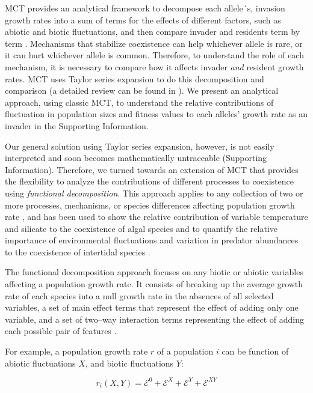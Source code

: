 MCT provides an analytical framework to decompose each allele´s, invasion growth rates into a sum of terms for the effects of different factors, such as abiotic and biotic fluctuations, and then compare invader and residents term by term \citep{ellner_expanded_2019}. Mechanisms that stabilize coexistence can help whichever allele is rare, or it can hurt whichever allele is common. Therefore, to understand the role of each mechanism, it is necessary to compare how it affects invader \textit{and} resident growth rates. MCT uses Taylor series expansion to do this decomposition and comparison (a detailed review can be found in \citet{barabas_chessons_2018}). We present an analytical approach, using classic MCT, to understand the relative contributions of fluctuation in population sizes and fitness values to each alleles' growth rate as an invader in the Supporting Information.

Our general solution using Taylor series expansion, however, is not easily interpreted and soon becomes mathematically untraceable (Supporting Information). Therefore, we turned towards an extension of MCT \citep{ellner_expanded_2019} that provides the flexibility to analyze the contributions of different processes to coexistence using \textit{functional decomposition}. This approach applies to any collection of two or more processes, mechanisms, or species differences affecting population growth rate \citep{ ellner2016quantify, ellner_expanded_2019}, and has been used to show the relative contribution of variable temperature and silicate to the coexistence of algal species \citep{ellner2016quantify} and to quantify the relative importance of environmental fluctuations and variation in predator abundances to the coexistence of intertidal species \citep{shoemaker2020}.

The functional decomposition approach focuses on any biotic or abiotic variables affecting a population growth rate. It consists of breaking up the average growth rate of each species into a null growth rate in the absences of all selected variables, a set of main effect terms that represent the effect of adding only one variable, and a set of two--way interaction terms representing the effect of adding each possible pair of features \citep{ellner_expanded_2019}.

For example, a population growth rate $r$ of a population $i$ can be function of abiotic fluctuations $X$, and biotic fluctuations $Y$:

\begin{equation}
   r_{i}(X,Y) = \mathcal{E}^{0} + \mathcal{E}^{X}+ \mathcal{E}^{Y}+ \mathcal{E}^{XY}
   \label{functional_decomp}
\end{equation}

